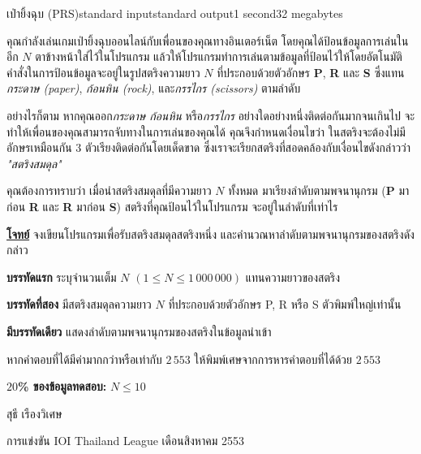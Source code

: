 \documentclass[11pt,a4paper]{article}
\begin{document}
\begin{problem}{เป่ายิ้งฉุบ (PRS)}{standard input}{standard output}{1 second}{32 megabytes}

คุณกำลังเล่นเกมเป่ายิ้งฉุบออนไลน์กับเพื่อนของคุณทางอินเตอร์เน็ต โดยคุณได้ป้อนข้อมูลการเล่นในอีก $N$ ตาข้างหน้าใส่ไว้ในโปรแกรม แล้วให้โปรแกรมทำการเล่นตามข้อมูลที่ป้อนไว้ให้โดยอัตโนมัติ คำสั่งในการป้อนข้อมูลจะอยู่ในรูปสตริงความยาว $N$ ที่ประกอบด้วยตัวอักษร \textbf{P}, \textbf{R} และ \textbf{S} ซึ่งแทน\textit{กระดาษ (paper)}, \textit{ก้อนหิน (rock)}, และ\textit{กรรไกร (scissors)} ตามลำดับ

อย่างไรก็ตาม หากคุณออก\textit{กระดาษ ก้อนหิน} หรือ\textit{กรรไกร} อย่างใดอย่างหนึ่งติดต่อกันมากจนเกินไป จะทำให้เพื่อนของคุณสามารถจับทางในการเล่นของคุณได้ คุณจึงกำหนดเงื่อนไขว่า ในสตริงจะต้องไม่มีอักษรเหมือนกัน $3$ ตัวเรียงติดต่อกันโดยเด็ดขาด ซึ่งเราจะเรียกสตริงที่สอดคล้องกับเงื่อนไขดังกล่าวว่า \textit{"สตริงสมดุล"}

คุณต้องการทราบว่า เมื่อนำสตริงสมดุลที่มีความยาว $N$ ทั้งหมด มาเรียงลำดับตามพจนานุกรม (\textbf{P} มาก่อน \textbf{R} และ \textbf{R} มาก่อน \textbf{S}) สตริงที่คุณป้อนไว้ในโปรแกรม จะอยู่ในลำดับที่เท่าไร


\bigskip
\underline{\textbf{โจทย์}}  จงเขียนโปรแกรมเพื่อรับสตริงสมดุลสตริงหนึ่ง และคำนวณหาลำดับตามพจนานุกรมของสตริงดังกล่าว


\InputFile

\textbf{บรรทัดแรก} ระบุจำนวนเต็ม $N$ $(1 \leq N \leq 1\,000\,000)$ แทนความยาวของสตริง

\textbf{บรรทัดที่สอง} มีสตริงสมดุลความยาว $N$ ที่ประกอบด้วยตัวอักษร P, R หรือ S ตัวพิมพ์ใหญ่เท่านั้น



\OutputFile

\textbf{มีบรรทัดเดียว} แสดงลำดับตามพจนานุกรมของสตริงในข้อมูลนำเข้า

หากคำตอบที่ได้มีค่ามากกว่าหรือเท่ากับ $2\,553$ ให้พิมพ์เศษจากการหารคำตอบที่ได้ด้วย $2\,553$

\Examples

\begin{example}
%
%
\end{example}

\Scoring

\textbf{$20$\% ของข้อมูลทดสอบ:} $N \leq 10$

\Source

สุธี เรืองวิเศษ

การแข่งขัน IOI Thailand League เดือนสิงหาคม 2553

\end{problem}
\end{document}
